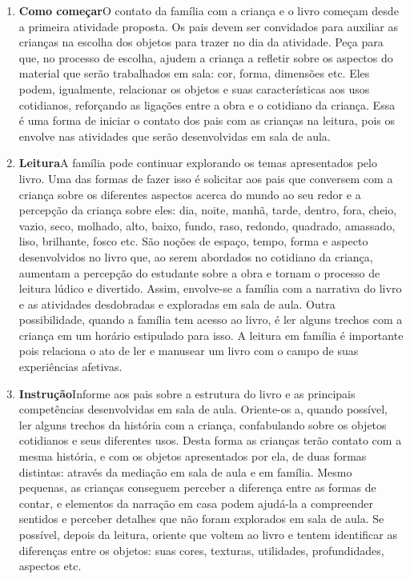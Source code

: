 \documentclass[11pt]{extarticle}
\begin{document}
\begin{enumerate}
\item \textbf{Como começar}\quad O contato da família com a criança e o livro começam desde a primeira atividade proposta. Os pais devem ser convidados para auxiliar as crianças na escolha dos objetos para trazer no dia da atividade. Peça para que, no processo de escolha, ajudem a criança a refletir sobre os aspectos do material que serão trabalhados em sala: cor, forma, dimensões etc. Eles podem, igualmente, relacionar os objetos e suas características aos usos cotidianos, reforçando as ligações entre a obra e o cotidiano da criança.
Essa é uma forma de iniciar o contato dos pais com as crianças na leitura, pois os envolve nas atividades que serão desenvolvidas em sala de aula.

\item \textbf{Leitura}\quad A família pode continuar 
explorando os temas apresentados pelo livro. Uma das formas de fazer isso é solicitar aos pais que conversem com a criança sobre os diferentes aspectos acerca do mundo ao seu redor e a percepção da criança sobre eles: dia, noite, manhã, tarde, dentro, fora, cheio, vazio, seco, molhado, alto, baixo, fundo, raso, redondo, quadrado, amassado, liso, brilhante, fosco etc. São noções de espaço, tempo, forma e aspecto desenvolvidos no livro que, ao serem abordados no cotidiano da criança, aumentam a percepção do estudante sobre a obra e tornam o processo de leitura lúdico e divertido. Assim, envolve-se a família com a narrativa do livro e as atividades desdobradas e exploradas em sala de aula.
Outra possibilidade, quando a família tem acesso ao livro, é ler alguns trechos com a criança em um horário estipulado para isso. A leitura em família é importante pois relaciona o ato de ler e manusear um livro com o campo de suas experiências afetivas.

\item \textbf{Instrução}\quad Informe aos pais sobre a estrutura do livro e as principais competências desenvolvidas em sala de aula.
Oriente-os a, quando possível, ler alguns trechos da história com a criança, confabulando sobre os objetos cotidianos e seus diferentes usos.
Desta forma as crianças terão contato com a mesma história, e com os objetos apresentados por ela, de duas formas distintas: através da mediação em sala de aula e em família. 
Mesmo pequenas, as crianças conseguem perceber a diferença entre 
as formas de contar, e elementos da narração em casa podem ajudá-la a compreender 
sentidos e perceber detalhes que não foram explorados em sala de aula. Se possível, depois da leitura, oriente 
que voltem ao livro e tentem identificar as diferenças entre os objetos: suas cores, texturas, utilidades, profundidades, aspectos etc.


\end{enumerate}
\end{document}
